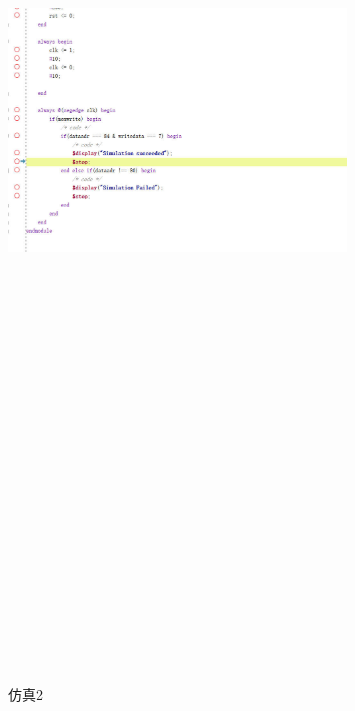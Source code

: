 \begin{figure}[htbp]
    \centering
    \includegraphics[width=0.8\textwidth,height=20in,keepaspectratio]{Simulation2.jpg}
    \caption{仿真2}
    \label{image2}
\end{figure}